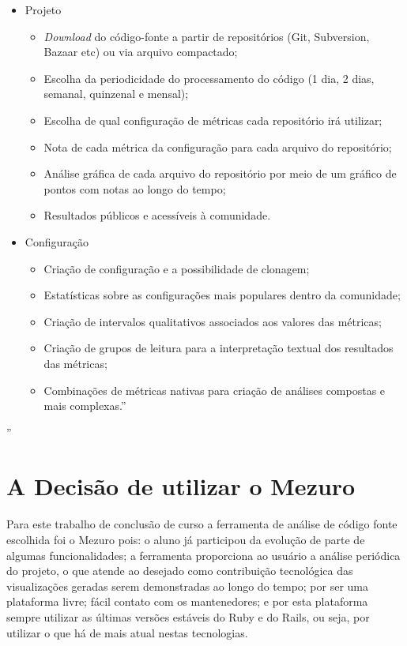 \begin{itemize}
  \item Projeto
    \begin{itemize}
    \item \textit{Download} do código-fonte a partir de repositórios (Git,
    Subversion, Bazaar etc) ou via arquivo compactado;
        \item Escolha da periodicidade do processamento do código (1 dia, 2 dias,
        semanal, quinzenal e mensal);
        \item Escolha de qual configuração de métricas cada repositório irá
        utilizar;
        \item Nota de cada métrica da configuração para cada arquivo do
        repositório;
        \item Análise gráfica de cada arquivo do repositório por meio de um
        gráfico de pontos com notas ao longo do tempo;
        \item Resultados públicos e acessíveis à comunidade.
    \end{itemize}
    \item Configuração
    \begin{itemize}
    \item Criação de configuração e a possibilidade de clonagem;
        \item Estatísticas sobre as configurações mais populares dentro da
        comunidade;
        \item Criação de intervalos qualitativos associados aos valores das
        métricas;
        \item Criação de grupos de leitura para a interpretação textual dos
        resultados das métricas;
        \item Combinações de métricas nativas para criação de análises compostas
        e mais complexas.''
    \end{itemize}
\end{itemize}
''

\newpage

\section{A Decisão de utilizar o Mezuro}

Para este trabalho de conclusão de curso a ferramenta de análise de código
fonte escolhida foi o Mezuro pois: o aluno já participou da evolução de parte
de algumas funcionalidades; a ferramenta proporciona ao usuário a análise
periódica do projeto, o que atende ao desejado como contribuição tecnológica
das visualizações geradas serem demonstradas ao longo do tempo; por ser uma
plataforma livre; fácil contato com os mantenedores; e por esta plataforma
sempre utilizar as últimas versões estáveis do Ruby e do Rails, ou seja,
por utilizar o que há de mais atual nestas tecnologias.

